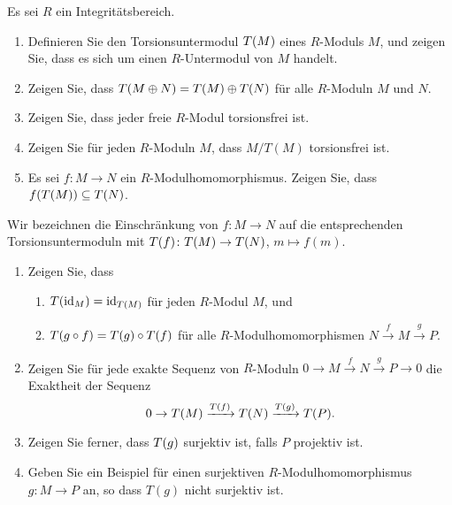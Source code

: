\begin{question}[subtitle=Torsionsuntermoduln]
  Es sei $R$ ein Integritätsbereich.
  \begin{enumerate}
    \item
      Definieren Sie den Torsionsuntermodul $T(M)$ eines $R$-Moduls $M$, und zeigen Sie, dass es sich um einen $R$-Untermodul von $M$ handelt.
    \item
      Zeigen Sie, dass $T(M \oplus N) = T(M) \oplus T(N)$ für alle $R$-Moduln $M$ und $N$.
    \item
      Zeigen Sie, dass jeder freie $R$-Modul torsionsfrei ist.
    \item
      Zeigen Sie für jeden $R$-Moduln $M$, dass $M/T(M)$ torsionsfrei ist.
    \item
      Es sei $f \colon M \to N$ ein $R$-Modulhomomorphismus.
      Zeigen Sie, dass $f(T(M)) \subseteq T(N)$.
  \end{enumerate}
  Wir bezeichnen die Einschränkung von $f \colon M \to N$ auf die entsprechenden Torsionsuntermoduln mit $T(f) \colon T(M) \to T(N)$, $m \mapsto f(m)$.
  \begin{enumerate}[resume]
    \item
      Zeigen Sie, dass
      \begin{enumerate}
        \item
          $T(\operatorname{id}_M) = \operatorname{id}_{T(M)}$ für jeden $R$-Modul $M$, und
        \item
          $T(g \circ f) = T(g) \circ T(f)$ für alle $R$-Modulhomomorphismen $N \xrightarrow{f} M \xrightarrow{g} P$.
      \end{enumerate}
    \item
      Zeigen Sie für jede exakte Sequenz von $R$-Moduln $0 \to M \xrightarrow{f} N \xrightarrow{g} P \to 0$ die Exaktheit der Sequenz
      \[
                                  0
        \to                       T(M)
        \xrightarrow{T(f)} T(N)
        \xrightarrow{T(g)} T(P).
      \]
    \item
      Zeigen Sie ferner, dass $T(g)$ surjektiv ist, falls $P$ projektiv ist.
    \item
      Geben Sie ein Beispiel für einen surjektiven $R$-Modulhomomorphismus $g \colon M \to P$ an, so dass $T(g)$ nicht surjektiv ist.
  \end{enumerate}
\end{question}


